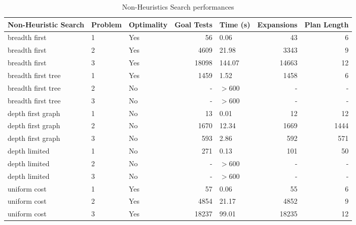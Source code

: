 \documentclass[a4paper]{article}
\begin{document}


\begin{table}[ht!]
\centering
\begin{tabular}{lllrlrr}
{Non-Heuristic Search} & Problem & Optimality &  Goal Tests & Time (s) &  Expansions &  Plan Length \\
\midrule
breadth first                   &       1 &         Yes &       56 &         0.06 &       43 &          6 \\
breadth first                   &       2 &         Yes &     4609 &        21.98 &     3343 &          9 \\
breadth first                   &       3 &         Yes &    18098 &       144.07 &    14663 &         12 \\
breadth first tree              &       1 &         Yes &     1459 &         1.52 &     1458 &          6 \\
breadth first tree              &       2 &         No &        - &   $>600$ &        - &          - \\
breadth first tree              &       3 &         No &        - &   $>600$ &        - &          - \\
depth first graph               &       1 &         No &       13 &         0.01 &       12 &         12 \\
depth first graph               &       2 &         No &     1670 &        12.34 &     1669 &       1444 \\
depth first graph               &       3 &         No &      593 &         2.86 &      592 &        571 \\
depth limited                   &       1 &         No &      271 &         0.13 &      101 &         50 \\
depth limited                   &       2 &         No &        - &   $>600$ &        - &          - \\
depth limited                   &       3 &         No &        - &   $>600$ &        - &          - \\
uniform cost                    &       1 &         Yes &       57 &         0.06 &       55 &          6 \\
uniform cost                    &       2 &         Yes &     4854 &        21.17 &     4852 &          9 \\
uniform cost                    &       3 &         Yes &    18237 &        99.01 &    18235 &         12 \\
\end{tabular}
\caption{\label{tab:final_results}Non-Heuristics Search performances}
\end{table}
\end{document}
